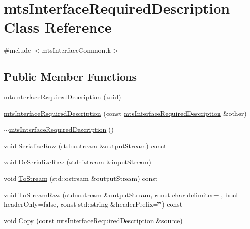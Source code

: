 \hypertarget{classmts_interface_required_description}{}\section{mts\+Interface\+Required\+Description Class Reference}
\label{classmts_interface_required_description}


{\ttfamily \#include $<$mts\+Interface\+Common.\+h$>$}

\subsection*{Public Member Functions}
\begin{DoxyCompactItemize}
\item 
\hyperlink{classmts_interface_required_description_aaa741ceb61ee4f711938ac9b9f06046a}{mts\+Interface\+Required\+Description} (void)
\item 
\hyperlink{classmts_interface_required_description_af90da365e04969de0cb21a5a788732b6}{mts\+Interface\+Required\+Description} (const \hyperlink{classmts_interface_required_description}{mts\+Interface\+Required\+Description} \&other)
\item 
\hyperlink{classmts_interface_required_description_a632f622ee945050843e2304402d4cfe3}{$\sim$mts\+Interface\+Required\+Description} ()
\item 
void \hyperlink{classmts_interface_required_description_aa5f6037f3381b6afda5b9873cd20d7a2}{Serialize\+Raw} (std\+::ostream \&output\+Stream) const 
\item 
void \hyperlink{classmts_interface_required_description_a37f451181a83b4ab25478861ccb2e1e9}{De\+Serialize\+Raw} (std\+::istream \&input\+Stream)
\item 
void \hyperlink{classmts_interface_required_description_ac2c3623e9e10f3fbfe393ae7418cd94c}{To\+Stream} (std\+::ostream \&output\+Stream) const 
\item 
void \hyperlink{classmts_interface_required_description_a994e1b82aa21b7bea9e199ab6e89979e}{To\+Stream\+Raw} (std\+::ostream \&output\+Stream, const char delimiter= \textquotesingle{} \textquotesingle{}, bool header\+Only=false, const std\+::string \&header\+Prefix=\char`\"{}\char`\"{}) const 
\item 
void \hyperlink{classmts_interface_required_description_ae03fdf98cb5fb0404ddf7e8698fcc10e}{Copy} (const \hyperlink{classmts_interface_required_description}{mts\+Interface\+Required\+Description} \&source)

\end{DoxyCompactItemize}
